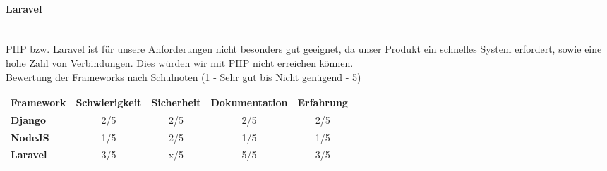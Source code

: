 \documentclass[11pt]{article}
\begin{document}
\paragraph{Laravel} \mbox{}\\
PHP bzw. Laravel ist f\"ur unsere Anforderungen nicht besonders gut geeignet, da unser Produkt ein schnelles System erfordert, sowie eine hohe Zahl von Verbindungen. Dies w\"urden wir mit PHP nicht erreichen k\"onnen.
\\

Bewertung der Frameworks nach Schulnoten (1 - Sehr gut bis Nicht gen\"ugend - 5)
\begin{table}[ht]
\centering
\begin{tabular}{|l|c|c|c|c|l}
\cline{1-5}
\textbf{Framework} & \multicolumn{1}{l|}{\textbf{Schwierigkeit}} & \multicolumn{1}{l|}{\textbf{Sicherheit}} & \multicolumn{1}{l|}{\textbf{Dokumentation}} & \multicolumn{1}{l|}{\textbf{Erfahrung}} & \\ \cline{1-5}
\textbf{Django}    & 2/5                                         & 2/5                                      & 2/5                                         & 2/5                                     & \\ \cline{1-5}
\textbf{NodeJS}    & 1/5                                         & 2/5                                      & 1/5                                         & 1/5                                     & \\ \cline{1-5}
\textbf{Laravel}   & 3/5                                         & x/5                                      & 5/5                                         & 3/5                                     & \\ \cline{1-5}
\end{tabular}
\end{table}
\newpage
\end{document}
